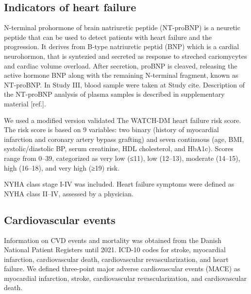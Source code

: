 \documentclass[
  a4paper,
  headsepline=true,
  open=any]{scrbook}
\begin{document}
\hypertarget{indicators-of-heart-failure}{%
\subsection{Indicators of heart
failure}\label{indicators-of-heart-failure}}

N-terminal prohormone of brain natriuretic peptide (NT-proBNP) is a
neuretic peptide that can be used to detect patients with heart failure
and the progression. It derives from B-type natriuretic peptid (BNP)
which is a cardial neurohormon, that is syntezied and secreted as
response to streched cariomycytes and cardiac volume overload. After
secretion, proBNP is cleaved, releasing the active hormone BNP along
with the remaining N-terminal fragment, known as NT-proBNP. In Study
III, blood sample were taken at Study cite. Description of the NT-proBNP
analysis of plasma samples is described in supplementary material
{[}ref.{]}.

We used a modified version validated The WATCH-DM heart failure risk
score. The risk score is based on 9 variables: two binary (history of
myocardial infarction and coronary artery bypass grafting) and seven
continuous (age, BMI, systolic/diastolic BP, serum creatinine, HDL
cholesterol, and HbA1c). Scores range from 0--39, categorized as very
low (≤11), low (12--13), moderate (14--15), high (16--18), and very high
(≥19) risk.

NYHA class stage I-IV was included. Heart failure symptoms were defined
as NYHA class II--IV, assessed by a physician.

\hypertarget{cardiovascular-events}{%
\subsection{Cardiovascular events}\label{cardiovascular-events}}

Information on CVD events and mortality was obtained from the Danish
National Patient Registers until 2021. ICD-10 codes for stroke,
myocardial infarction, cardiovascular death, cardiovascular
revascularization, and heart failure. We defined three-point major
adverse cardiovascular events (MACE) as myocardial infarction, stroke,
cardiovascular revascularization, and cardiovascular death.
\end{document}
